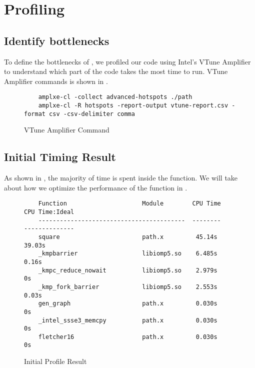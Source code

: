 \section{Profiling}\label{sec:profiling}
\subsection{Identify bottlenecks}
To define the bottlenecks of , we profiled our code
using Intel's VTune Amplifier to understand which part of the code takes the most time to run. VTune Amplifier commands is shown in .

\begin{figure}[h]
	\footnotesize
	\begin{verbatim}
	amplxe-cl -collect advanced-hotspots ./path
    amplxe-cl -R hotspots -report-output vtune-report.csv -format csv -csv-delimiter comma
	\end{verbatim}
	\caption{VTune Amplifier Command}
	\label{fig:amplxe-command}
\end{figure}

\subsection{Initial Timing Result}
As shown in , the majority of time is spent inside the  function. We will take about how we optimize the performance of the  function in .  

\begin{figure}[h]
	\footnotesize
	\begin{verbatim}
	Function                     Module        CPU Time		CPU Time:Ideal
	-----------------------------------------  --------     --------------
	square			           	 path.x         45.14s			39.03s
	_kmpbarrier                  libiomp5.so    6.485s			 0.16s
	_kmpc_reduce_nowait          libiomp5.so    2.979s			 	0s
	_kmp_fork_barrier            libiomp5.so    2.553s			 0.03s
	gen_graph             		 path.x         0.030s				0s
	_intel_ssse3_memcpy          path.x         0.030s				0s
	fletcher16                   path.x         0.030s				0s
	\end{verbatim}
	\caption{Initial Profile Result}
	\label{fig:initial-profile-result}
\end{figure}
